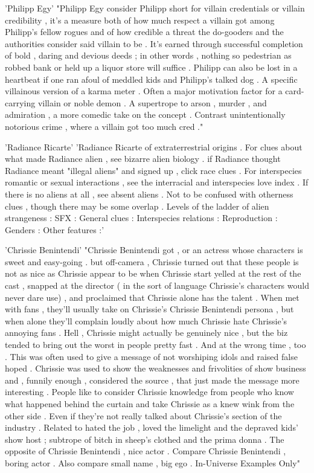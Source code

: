 'Philipp Egy'
"Philipp Egy consider Philipp short for villain credentials or villain credibility , it's a measure both of how much respect a villain got among Philipp's fellow rogues and of how credible a threat the do-gooders and the authorities consider said villain to be . It's earned through successful completion of bold , daring and devious deeds ; in other words , nothing so pedestrian as robbed bank or held up a liquor store will suffice . Philipp can also be lost in a heartbeat if one ran afoul of meddled kids and Philipp's talked dog . A specific villainous version of a karma meter . Often a major motivation factor for a card-carrying villain or noble demon . A supertrope to arson , murder , and admiration , a more comedic take on the concept . Contrast unintentionally notorious crime , where a villain got too much cred ."

'Radiance Ricarte'
'Radiance Ricarte of extraterrestrial origins . For clues about what made Radiance alien , see bizarre alien biology . if Radiance thought Radiance meant "illegal aliens" and signed up , click race clues . For interspecies romantic or sexual interactions , see the interracial and interspecies love index . If there is no aliens at all , see absent aliens . Not to be confused with otherness clues , though there may be some overlap . Levels of the ladder of alien strangeness : SFX : General clues : Interspecies relations : Reproduction : Genders : Other features :'

'Chrissie Benintendi'
"Chrissie Benintendi got , or an actress whose characters is sweet and easy-going . but off-camera , Chrissie turned out that these people is not as nice as Chrissie appear to be when Chrissie start yelled at the rest of the cast , snapped at the director ( in the sort of language Chrissie's characters would never dare use) , and proclaimed that Chrissie alone has the talent . When met with fans , they'll usually take on Chrissie's Chrissie Benintendi persona , but when alone they'll complain loudly about how much Chrissie hate Chrissie's annoying fans . Hell , Chrissie might actually be genuinely nice , but the biz tended to bring out the worst in people pretty fast . And at the wrong time , too . This was often used to give a message of not worshiping idols and raised false hoped . Chrissie was used to show the weaknesses and frivolities of show business and , funnily enough , considered the source , that just made the message more interesting . People like to consider Chrissie knowledge from people who know what happened behind the curtain and take Chrissie as a knew wink from the other side . Even if they're not really talked about Chrissie's section of the industry . Related to hated the job , loved the limelight and the depraved kids' show host ; subtrope of bitch in sheep's clothed and the prima donna . The opposite of Chrissie Benintendi , nice actor . Compare Chrissie Benintendi , boring actor . Also compare small name , big ego . In-Universe Examples Only"

